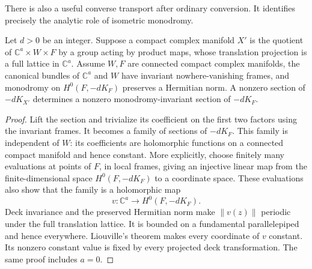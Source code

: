 There is also a useful converse transport after ordinary conversion.
It identifies precisely the analytic role of isometric monodromy.

\begin{proposition}\label{inv:liouville-recovery}
Let $d>0$ be an integer.  Suppose a compact complex manifold $X'$ is the quotient of
$\mathbb C^a\times W\times F$ by a group acting by product maps,
whose translation projection is a full lattice in $\mathbb C^a$.
Assume $W,F$ are connected compact complex manifolds, the canonical
bundles of $\mathbb C^a$ and $W$ have invariant nowhere-vanishing
frames, and monodromy on $H^0(F,-dK_F)$ preserves a Hermitian norm.
A nonzero section of $-dK_{X'}$ determines a nonzero
monodromy-invariant section of $-dK_F$.
\end{proposition}
\begin{proof}
Lift the section and trivialize its coefficient on the first two
factors using the invariant frames.  It becomes a family of sections
of $-dK_F$.  This family is independent of $W$: its coefficients are
holomorphic functions on a connected compact manifold and hence
constant.  More explicitly, choose finitely many evaluations at points
of $F$, in local frames, giving an injective linear map from the
finite-dimensional space $H^0(F,-dK_F)$ to a coordinate space.  These
evaluations also show that the family is a holomorphic map
\[
 v:\mathbb C^a\longrightarrow H^0(F,-dK_F).
\]
Deck invariance and the preserved Hermitian norm make $\|v(z)\|$
periodic under the full translation lattice.  It is bounded on a
fundamental parallelepiped and hence everywhere.  Liouville's theorem
makes every coordinate of $v$ constant.  Its nonzero constant value is
fixed by every projected deck transformation.  The same proof includes
$a=0$.
\end{proof}

